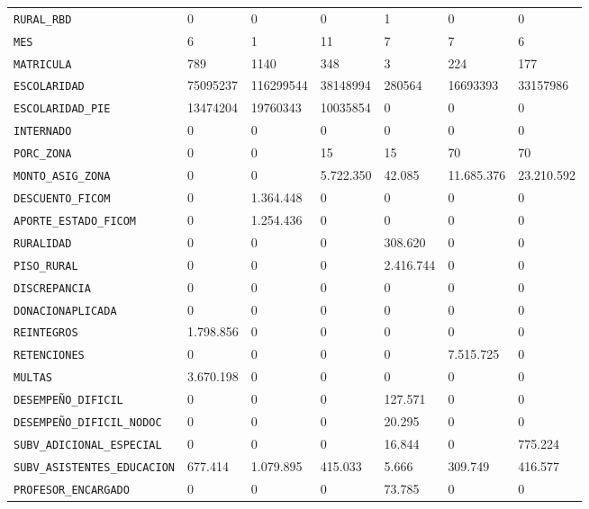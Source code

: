 \documentclass[10pt]{article}
\begin{document}
\begin{xltabular}{\linewidth}{@{}p{4.3cm} Y Y Y Y Y Y @{}}
\texttt{RURAL\_\allowbreak{}RBD} & 0 & 0 & 0 & 1 & 0 & 0 \\
\texttt{MES} & 6 & 1 & 11 & 7 & 7 & 6 \\
\texttt{MATRICULA} & 789 & 1140 & 348 & 3 & 224 & 177 \\
\texttt{ESCOLARIDAD} & 75095237 & 116299544 & 38148994 & 280564 & 16693393 & 33157986 \\
\texttt{ESCOLARIDAD\_\allowbreak{}PIE} & 13474204 & 19760343 & 10035854 & 0 & 0 & 0 \\
\texttt{INTERNADO} & 0 & 0 & 0 & 0 & 0 & 0 \\
\texttt{PORC\_\allowbreak{}ZONA} & 0 & 0 & 15 & 15 & 70 & 70 \\
\texttt{MONTO\_\allowbreak{}ASIG\_\allowbreak{}ZONA} & 0 & 0 & 5.722.350 & 42.085 & 11.685.376 & 23.210.592 \\
\texttt{DESCUENTO\_\allowbreak{}FICOM} & 0 & 1.364.448 & 0 & 0 & 0 & 0 \\
\texttt{APORTE\_\allowbreak{}ESTADO\_\allowbreak{}FICOM} & 0 & 1.254.436 & 0 & 0 & 0 & 0 \\
\texttt{RURALIDAD} & 0 & 0 & 0 & 308.620 & 0 & 0 \\
\texttt{PISO\_\allowbreak{}RURAL} & 0 & 0 & 0 & 2.416.744 & 0 & 0 \\
\texttt{DISCREPANCIA} & 0 & 0 & 0 & 0 & 0 & 0 \\
\texttt{DONACIONAPLICADA} & 0 & 0 & 0 & 0 & 0 & 0 \\
\texttt{REINTEGROS} & 1.798.856 & 0 & 0 & 0 & 0 & 0 \\
\texttt{RETENCIONES} & 0 & 0 & 0 & 0 & 7.515.725 & 0 \\
\texttt{MULTAS} & 3.670.198 & 0 & 0 & 0 & 0 & 0 \\
\texttt{DESEMPEÑO\_\allowbreak{}DIFICIL} & 0 & 0 & 0 & 127.571 & 0 & 0 \\
\texttt{DESEMPEÑO\_\allowbreak{}DIFICIL\_\allowbreak{}NODOC} & 0 & 0 & 0 & 20.295 & 0 & 0 \\
\texttt{SUBV\_\allowbreak{}ADICIONAL\_\allowbreak{}ESPECIAL} & 0 & 0 & 0 & 16.844 & 0 & 775.224 \\
\texttt{SUBV\_\allowbreak{}ASISTENTES\_\allowbreak{}EDUCACION} & 677.414 & 1.079.895 & 415.033 & 5.666 & 309.749 & 416.577 \\
\texttt{PROFESOR\_\allowbreak{}ENCARGADO} & 0 & 0 & 0 & 73.785 & 0 & 0 \\

\end{xltabular}
\end{document}
